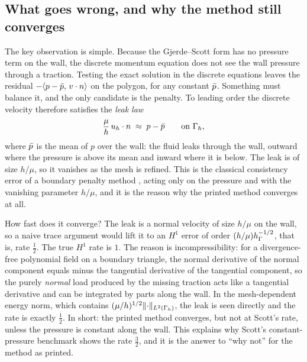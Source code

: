 \subsection{What goes wrong, and why the method still converges}
The key observation is simple. Because the Gjerde--Scott form has no pressure term on the wall, the discrete momentum equation does not see the wall pressure through a traction. Testing the exact solution in the discrete equations leaves the residual $-\langle p-\bar p,\, v\cdot n\rangle$ on the polygon, for any constant $\bar p$. Something must balance it, and the only candidate is the penalty. To leading order the discrete velocity therefore satisfies the \emph{leak law}
\[
\frac\mu h\,u_h\cdot n\;\approx\;p-\bar p\qquad\text{on }\Gamma_h ,
\]
where $\bar p$ is the mean of $p$ over the wall: the fluid leaks through the wall, outward where the pressure is above its mean and inward where it is below. The leak is of size $h/\mu$, so it vanishes as the mesh is refined. This is the classical consistency error of a boundary penalty method \cite{Babuska1973}, acting only on the pressure and with the vanishing parameter $h/\mu$, and it is the reason why the printed method converges at all.

How fast does it converge? The leak is a normal velocity of size $h/\mu$ on the wall, so a naive trace argument would lift it to an $H^1$ error of order $(h/\mu)h_\Gamma^{-1/2}$, that is, rate $\frac12$. The true $H^1$ rate is $1$. The reason is incompressibility: for a divergence-free polynomial field on a boundary triangle, the normal derivative of the normal component equals minus the tangential derivative of the tangential component, so the purely \emph{normal} load produced by the missing traction acts like a tangential derivative and can be integrated by parts along the wall. In the mesh-dependent energy norm, which contains $(\mu/h)^{1/2}\lVert \cdot\rVert_{L^2(\Gamma_h)}$, the leak is seen directly and the rate is exactly $\frac12$. In short: the printed method converges, but not at Scott's rate, unless the pressure is constant along the wall. This explains why Scott's constant-pressure benchmark shows the rate $\frac32$, and it is the answer to ``why not'' for the method as printed.


